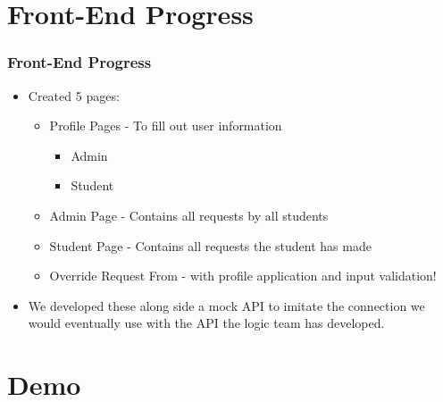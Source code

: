 \documentclass[aspectratio=169, t]{beamer}
\begin{document}
\section{Front-End Progress}
\begin{frame}
  \frametitle{Front-End Progress}
  \begin{itemize}
    \item Created 5 pages:
    \begin{itemize}
            \item Profile Pages - To fill out user information
              \begin{itemize}
                  \item Admin
                  \item Student
              \end{itemize}
              \item Admin Page - Contains all requests by all students
              \item Student Page - Contains all requests the student has made
              \item Override Request From - with profile application and input validation!     
    \end{itemize}
    \item We developed these along side a mock API to imitate the connection we would eventually use with the API the logic team has developed.
  \end{itemize}
\end{frame}

\section{Demo}

\section{}
\maketitle
\end{document}
